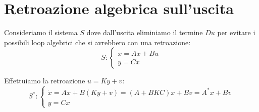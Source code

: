 \documentclass[../main.tex]{subfiles}
\begin{document}
	\section{Retroazione algebrica sull'uscita}
		Consideriamo il sistema $ S $ dove dall'uscita eliminiamo il termine $ Du $ per evitare i possibili loop algebrici che si avrebbero con una retroazione:
		\[
			S:
			\begin{cases}
				\dot x = Ax+Bu\\
				y = Cx
			\end{cases}
		\]
		
		Effettuiamo la retroazione $ u = Ky +v $:
		\[
			S^{*}:
			\begin{cases}
				\dot x = Ax + B(Ky+v) = (A+BKC)x + Bv = A^{*}x + Bv\\
				y = Cx
			\end{cases}
		\]
		
\end{document}
